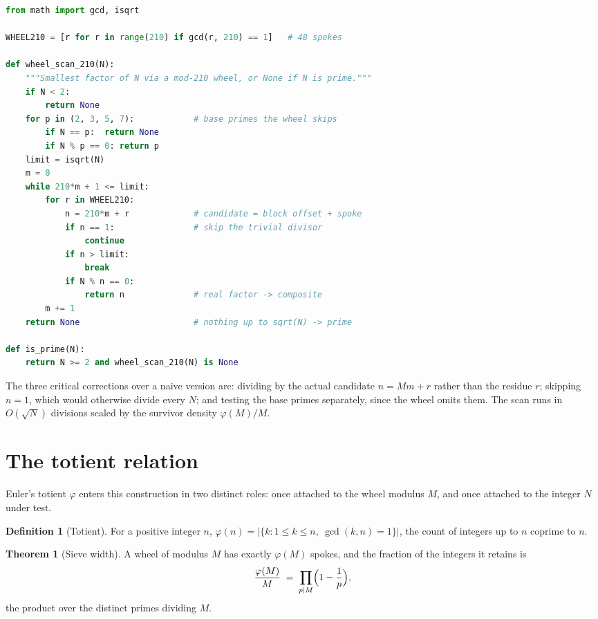 \documentclass[11pt]{article}
\theoremstyle{definition}
\newtheorem{definition}{Definition}
\newtheorem{theorem}{Theorem}
\begin{document}
\begin{lstlisting}[language=Python]
from math import gcd, isqrt

WHEEL210 = [r for r in range(210) if gcd(r, 210) == 1]   # 48 spokes

def wheel_scan_210(N):
    """Smallest factor of N via a mod-210 wheel, or None if N is prime."""
    if N < 2:
        return None
    for p in (2, 3, 5, 7):            # base primes the wheel skips
        if N == p:  return None
        if N % p == 0: return p
    limit = isqrt(N)
    m = 0
    while 210*m + 1 <= limit:
        for r in WHEEL210:
            n = 210*m + r             # candidate = block offset + spoke
            if n == 1:                # skip the trivial divisor
                continue
            if n > limit:
                break
            if N % n == 0:
                return n              # real factor -> composite
        m += 1
    return None                       # nothing up to sqrt(N) -> prime

def is_prime(N):
    return N >= 2 and wheel_scan_210(N) is None
\end{lstlisting}

\noindent The three critical corrections over a naive version are: dividing by
the actual candidate $n=Mm+r$ rather than the residue $r$; skipping $n=1$, which
would otherwise divide every $N$; and testing the base primes separately, since
the wheel omits them. The scan runs in $O(\sqrt N)$ divisions scaled by the
survivor density $\varphi(M)/M$.

\section{The totient relation}

Euler's totient $\varphi$ enters this construction in two distinct roles: once
attached to the wheel modulus $M$, and once attached to the integer $N$ under
test.

\begin{definition}[Totient]
For a positive integer $n$,
$\varphi(n)=\bigl|\{k:1\le k\le n,\ \gcd(k,n)=1\}\bigr|$, the count of integers
up to $n$ coprime to $n$.
\end{definition}

\begin{theorem}[Sieve width]\label{thm:sievewidth}
A wheel of modulus $M$ has exactly $\varphi(M)$ spokes, and the fraction of the
integers it retains is
\[
  \frac{\varphi(M)}{M} \;=\; \prod_{p\mid M}\Bigl(1-\frac1p\Bigr),
\]
the product over the distinct primes dividing $M$.
\end{theorem}
\end{document}
